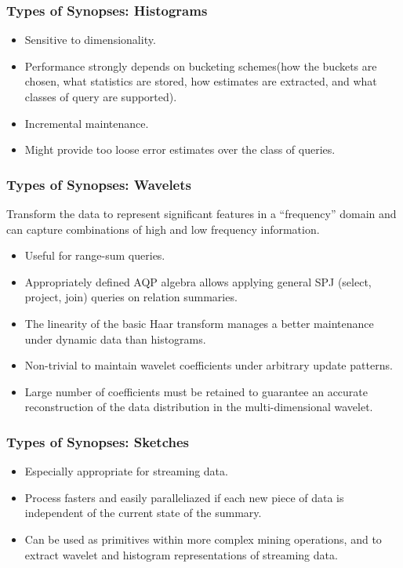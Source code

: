 \documentclass{beamer}
\begin{document}
\begin{frame}
\frametitle{Types of Synopses: Histograms}
\begin{itemize}
\item{Sensitive to dimensionality.}
\item{Performance strongly depends on bucketing schemes(how the buckets are chosen, what statistics are stored, how estimates are extracted, and what classes of query are supported).}
\item{Incremental maintenance.}
\item{Might provide too loose error estimates over the class of queries.}
\end{itemize}
\end{frame}

\begin{frame}
\frametitle{Types of Synopses: Wavelets}
Transform the data to represent significant features in a “frequency” domain and can capture combinations of high and low frequency information.\pause
\begin{itemize}
\item{Useful for range-sum queries.}
\item{Appropriately defined AQP algebra allows applying general SPJ (select, project, join) queries on relation summaries.}
\item{The linearity of the basic Haar transform manages a better maintenance under dynamic data than histograms.}
\item{Non-trivial to maintain wavelet coefficients under arbitrary update patterns.}
\item{Large number of coefficients must be retained to guarantee an accurate reconstruction of the data distribution in the multi-dimensional wavelet.}
\end{itemize}
\end{frame}

\begin{frame}
\frametitle{Types of Synopses: Sketches}
\begin{itemize}
\item{Especially appropriate for streaming data.}
\item{Process fasters and easily paralleliazed if each new piece of data is independent of the current state of the summary.}
\item{Can be used as primitives within more complex mining operations, and to extract wavelet and histogram representations of streaming data.}
\end{itemize}
\end{frame}
\end{document}
